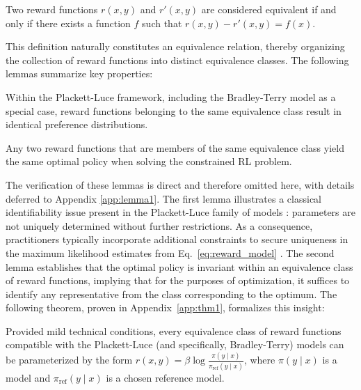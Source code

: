 \begin{definition}
Two reward functions $r(x, y)$ and $r'(x, y)$ are considered equivalent if and only if there exists a function $f$ such that ${r(x, y) - r'(x, y) = f(x)}$.
\end{definition}

This definition naturally constitutes an equivalence relation, thereby organizing the collection of reward functions into distinct equivalence classes. The following lemmas summarize key properties:

\begin{lemma}\label{lemma:same_prefrence} Within the Plackett-Luce framework, including the Bradley-Terry model as a special case, reward functions belonging to the same equivalence class result in identical preference distributions.
\end{lemma}

\begin{lemma}\label{lemma:same_policy}
    Any two reward functions that are members of the same equivalence class yield the same optimal policy when solving the constrained RL problem.
\end{lemma}

The verification of these lemmas is direct and therefore omitted here, with details deferred to Appendix \ref{app:lemma1}. The first lemma illustrates a classical identifiability issue present in the Plackett-Luce family of models \cite{plackett1975analysis}: parameters are not uniquely determined without further restrictions. As a consequence, practitioners typically incorporate additional constraints to secure uniqueness in the maximum likelihood estimates from Eq.~\ref{eq:reward_model} \cite{bong2022generalized}. The second lemma establishes that the optimal policy is invariant within an equivalence class of reward functions, implying that for the purposes of optimization, it suffices to identify any representative from the class corresponding to the optimum. The following theorem, proven in Appendix~\ref{app:thm1}, formalizes this insight:

\begin{theorem}\label{thm:main}
    Provided mild technical conditions, every equivalence class of reward functions compatible with the Plackett-Luce (and specifically, Bradley-Terry) models can be parameterized by the form ${r(x, y) = \beta \log \frac{\pi(y\mid x)}{\pi_\text{ref}(y\mid x)}}$, where $\pi(y\mid x)$ is a model and $\pi_\text{ref}(y \mid x)$ is a chosen reference model.
\end{theorem}

